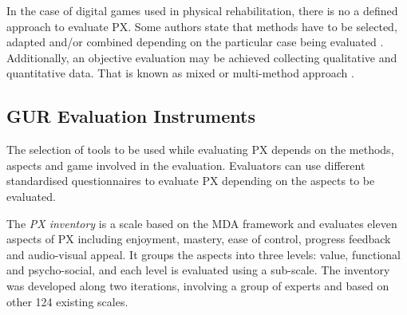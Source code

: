 
In the case of digital games used in physical rehabilitation, there is no a defined approach to evaluate \ac{PX}. Some authors state that methods have to be selected, adapted and/or combined depending on the particular case being evaluated \autocite{Yanez-Gomez2017,Wiemeyer2016,Mueller2015}. Additionally, an objective evaluation may be achieved collecting qualitative and quantitative data. That is known as mixed or multi-method approach \autocite{Nacke2009,Iacovides2015,Drachen2013,Mueller2015,Zammitto2014}.

\subsection{\ac{GUR} Evaluation Instruments}
\label{subsec:instruments}
The selection of tools to be used while evaluating \ac{PX} depends on the methods, aspects and game involved in the evaluation. Evaluators can use different standardised questionnaires to evaluate \ac{PX} depending on the aspects to be evaluated.

The \textit{\ac{PX} inventory} \autocite{VandenAbeele2016} is a scale based on the \ac{MDA} framework and evaluates eleven aspects of \ac{PX} including enjoyment, mastery, ease of control, progress feedback and audio-visual appeal. It groups the aspects into three levels: value, functional and psycho-social, and each level is evaluated using a sub-scale. The inventory was developed along two iterations, involving a group of experts and based on other 124 existing scales. 

